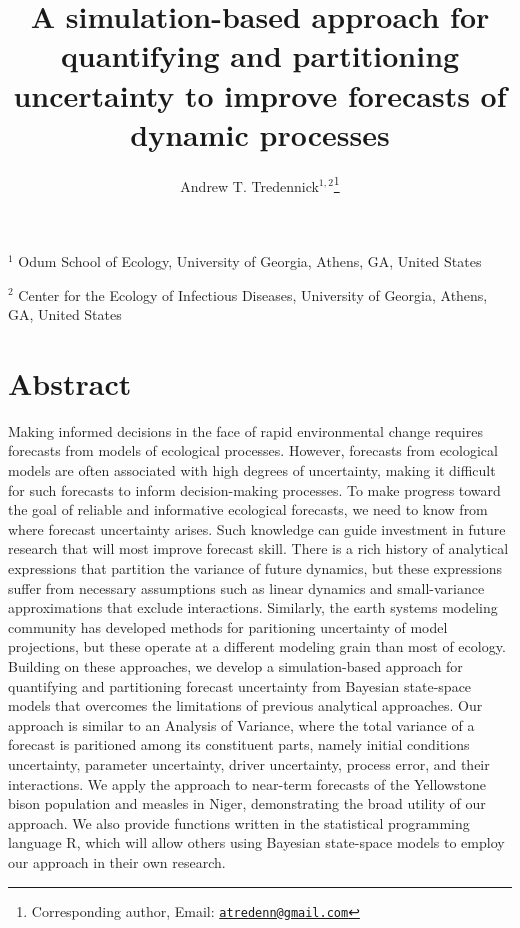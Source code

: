 \documentclass[12pt,]{article}
\title{A simulation-based approach for quantifying and partitioning uncertainty
to improve forecasts of dynamic processes}
\author{Andrew T. Tredennick\(^{1,2}\)\footnote{Corresponding author, Email:
  \href{mailto:atredenn@gmail.com}{\nolinkurl{atredenn@gmail.com}}}}
\date{}
\begin{document}
\maketitle

\newcommand{\smalltodo}[2][]
    {\todo[caption={#2}, #1]
    {\begin{spacing}{0.5}#2\end{spacing}}}

\setlength{\abovedisplayskip}{0pt} \raggedright
\setlength{\parindent}{36pt}

\noindent{}\(^1\) Odum School of Ecology, University of Georgia, Athens,
GA, United States

\noindent{}\(^2\) Center for the Ecology of Infectious Diseases,
University of Georgia, Athens, GA, United States

\section{Abstract}\label{abstract}

Making informed decisions in the face of rapid environmental change
requires forecasts from models of ecological processes. However,
forecasts from ecological models are often associated with high degrees
of uncertainty, making it difficult for such forecasts to inform
decision-making processes. To make progress toward the goal of reliable
and informative ecological forecasts, we need to know from where
forecast uncertainty arises. Such knowledge can guide investment in
future research that will most improve forecast skill. There is a rich
history of analytical expressions that partition the variance of future
dynamics, but these expressions suffer from necessary assumptions such
as linear dynamics and small-variance approximations that exclude
interactions. Similarly, the earth systems modeling community has
developed methods for paritioning uncertainty of model projections, but
these operate at a different modeling grain than most of ecology.
Building on these approaches, we develop a simulation-based approach for
quantifying and partitioning forecast uncertainty from Bayesian
state-space models that overcomes the limitations of previous analytical
approaches. Our approach is similar to an Analysis of Variance, where
the total variance of a forecast is paritioned among its constituent
parts, namely initial conditions uncertainty, parameter uncertainty,
driver uncertainty, process error, and their interactions. We apply the
approach to near-term forecasts of the Yellowstone bison population and
measles in Niger, demonstrating the broad utility of our approach. We
also provide functions written in the statistical programming language
R, which will allow others using Bayesian state-space models to employ
our approach in their own research.
\end{document}
